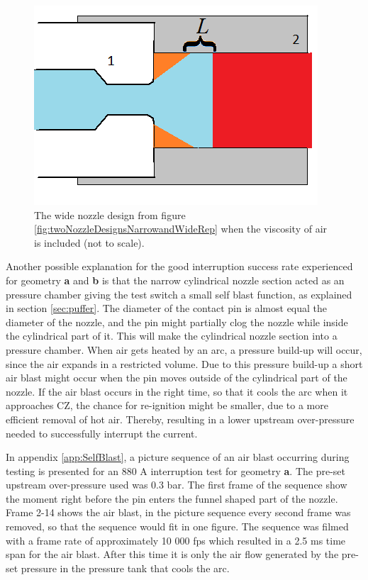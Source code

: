 \documentclass[10pt,b5paper,twoside]{article}
\begin{document}
\begin{figure}[H]
\centering
\includegraphics[scale=0.42]{Bilder/Results/nozzle_cooling_2_only_a.png}
\caption{The wide nozzle design from figure \ref{fig:twoNozzleDesignsNarrowandWideRep} when the viscosity of air is included (not to scale).} \label{fig:twoNozzleDesignsNarrowandWideRep_MIX}
\end{figure}

Another possible explanation for the good interruption success rate experienced for geometry \textbf{a} and \textbf{b} is that the narrow cylindrical nozzle section acted as an pressure chamber giving the test switch a small self blast function, as explained in section \ref{sec:puffer}. The diameter of the contact pin is almost equal the diameter of the nozzle, and the pin might partially clog the nozzle while inside the cylindrical part of it. This will make the cylindrical nozzle section into a pressure chamber.  When air gets heated by an arc, a pressure build-up will occur, since the air expands in a restricted volume. Due to this pressure build-up a short air blast might occur when the pin moves outside of the cylindrical part of the nozzle. If the air blast occurs in the right time, so that it cools the arc when it approaches CZ, the chance for re-ignition might be smaller, due to a more efficient removal of hot air. Thereby, resulting in a lower upstream over-pressure needed to successfully interrupt the current. 

In appendix \ref{app:SelfBlast}, a picture sequence of an air blast occurring during testing is presented for an 880 A interruption test for geometry \textbf{a}. The pre-set upstream over-pressure used was 0.3 bar. The first frame of the sequence show the moment right before the pin enters the funnel shaped part of the nozzle. Frame 2-14 shows the air blast, in the picture sequence every second frame was removed, so that the sequence would fit in one figure. The sequence was filmed with a frame rate of approximately 10 000 fps which resulted in a 2.5 ms time span for the air blast. After this time it is only the air flow generated by the pre-set pressure in the pressure tank that cools the arc.
\end{document}
